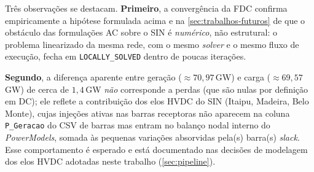 \begin{table}[!htb]
\captionsetup{width=14cm}
\end{table}

Três observações se destacam. \textbf{Primeiro}, a convergência da FDC confirma empiricamente a hipótese formulada acima e na \autoref{sec:trabalhos-futuros} de que o obstáculo das formulações AC sobre o SIN é \emph{numérico}, não estrutural: o problema linearizado da mesma rede, com o mesmo \textit{solver} e o mesmo fluxo de execução, fecha em \texttt{LOCALLY\_SOLVED} dentro de poucas iterações.

\textbf{Segundo}, a diferença aparente entre geração ($\approx 70{,}97$\,GW) e carga ($\approx 69{,}57$\,GW) de cerca de $1{,}4$\,GW \emph{não} corresponde a perdas (que são nulas por definição em DC); ele reflete a contribuição dos elos HVDC do SIN (Itaipu, Madeira, Belo Monte), cujas injeções ativas nas barras receptoras não aparecem na coluna \texttt{P\_Geracao} do CSV de barras mas entram no balanço nodal interno do \textit{PowerModels}, somada às pequenas variações absorvidas pela(s) barra(s) \textit{slack}. Esse comportamento é esperado e está documentado nas decisões de modelagem dos elos HVDC adotadas neste trabalho (\autoref{sec:pipeline}).

